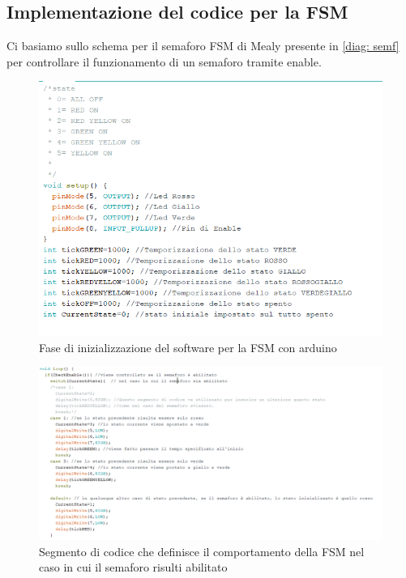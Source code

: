 \documentclass[10pt, a4paper, italian]{article}
\begin{document}
\subsection{Implementazione del codice per la FSM}
Ci basiamo sullo schema per il semaforo FSM di Mealy presente in \cref{diag: semf} per controllare il funzionamento di un semaforo tramite enable.
\begin{figure}[htbp]
    \centering
    \includegraphics[width=\textwidth]{Ard_iniz}
    \caption{Fase di inizializzazione del software per la FSM con arduino
    \label{fig: code_iniz}}
\end{figure}
\begin{figure}[htbp]
    \centering
    \includegraphics[width=\textwidth]{Ard_enable}
    \caption{Segmento di codice che definisce il comportamento della FSM nel caso in cui il semaforo risulti abilitato
    \label{fig: code_enable}}
\end{figure}
\end{document}
